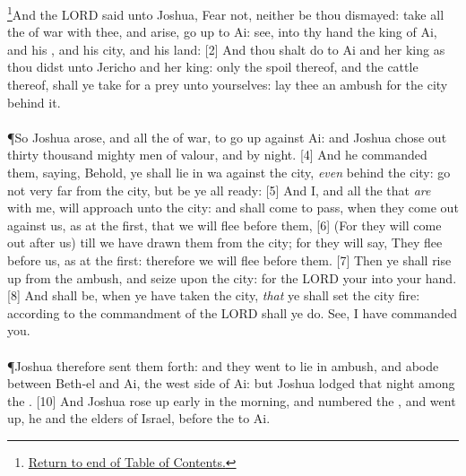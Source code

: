 \footnote{\textcolor[cmyk]{0.99998,1,0,0}{\hyperlink{TOC}{Return to end of Table of Contents.}}}\textcolor[cmyk]{0.99998,1,0,0}{And the LORD said unto Joshua, Fear not, neither be thou dismayed: take all the  of war with thee, and arise, go up to Ai: see,   into thy hand the king of Ai, and his , and his city, and his land:}
[2] \textcolor[cmyk]{0.99998,1,0,0}{And thou shalt do to Ai and her king as thou didst unto Jericho and her king: only the spoil thereof, and the cattle thereof, shall ye take for a prey unto yourselves: lay thee an ambush for the city behind it.}\\
\\
\P \textcolor[cmyk]{0.99998,1,0,0}{So Joshua arose, and all the  of war, to go up against Ai: and Joshua chose out thirty thousand mighty men of valour, and   by night.}
[4] \textcolor[cmyk]{0.99998,1,0,0}{And he commanded them, saying, Behold, ye shall lie in wa against the city, \emph{even} behind the city: go not very far from the city, but be ye all ready:}
[5] \textcolor[cmyk]{0.99998,1,0,0}{And I, and all the  that \emph{are} with me, will approach unto the city: and  shall come to pass, when they come out against us, as at the first, that we will flee before them,}
[6] \textcolor[cmyk]{0.99998,1,0,0}{(For they will come out after us) till we have drawn them from the city; for they will say, They flee before us, as at the first: therefore we will flee before them.}
[7] \textcolor[cmyk]{0.99998,1,0,0}{Then ye shall rise up from the ambush, and seize upon the city: for the LORD your   into your hand.}
[8] \textcolor[cmyk]{0.99998,1,0,0}{And  shall be, when ye have taken the city, \emph{that} ye shall set the city  fire: according to the commandment of the LORD shall ye do. See, I have commanded you.}\\
\\
\P \textcolor[cmyk]{0.99998,1,0,0}{Joshua therefore sent them forth: and they went to lie in ambush, and abode between Beth-el and Ai,  the west side of Ai: but Joshua lodged that night among the .}
[10] \textcolor[cmyk]{0.99998,1,0,0}{And Joshua rose up early in the morning, and numbered the , and went up, he and the elders of Israel, before the  to Ai.}
